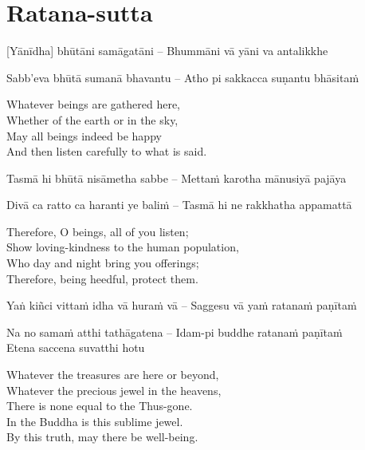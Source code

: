 \suttaRef{[Snp 2.4]}

\section{Ratana-sutta}
\label{ratana-sutta}

\vspace{-0.6em}

[Yānīdha] bhūtāni samāgatāni – Bhummāni vā yāni va antalikkhe\\
\begin{pali-hangtogether}
Sabb'eva bhūtā sumanā bhavantu – Atho pi sakkacca suṇantu bhāsitaṁ
\end{pali-hangtogether}

\begin{english-verses}
  Whatever beings are gathered here,\\
  Whether of the earth or in the sky,\\
  May all beings indeed be happy\\
  And then listen carefully to what is said.
\end{english-verses}

Tasmā hi bhūtā nisāmetha sabbe – Mettaṁ karotha mānusiyā pajāya\\
\begin{pali-hangtogether}
Divā ca ratto ca haranti ye baliṁ – Tasmā hi ne rakkhatha appamattā
\end{pali-hangtogether}

\begin{english-verses}
  Therefore, O beings, all of you listen;\\
  Show loving-kindness to the human population,\\
  Who day and night bring you offerings;\\
  Therefore, being heedful, protect them.
\end{english-verses}

\begin{pali-hang}
Yaṅ kiñci vittaṁ idha vā huraṁ vā – Saggesu vā yaṁ ratanaṁ paṇītaṁ\\
\end{pali-hang}
Na no samaṁ atthi tathāgatena – Idam-pi buddhe ratanaṁ paṇītaṁ\\
Etena saccena suvatthi hotu

\begin{english-verses}
  Whatever the treasures are here or beyond,\\
  Whatever the precious jewel in the heavens,\\
  There is none equal to the Thus-gone.\\
  In the Buddha is this sublime jewel.\\
  By this truth, may there be well-being.
\end{english-verses}

